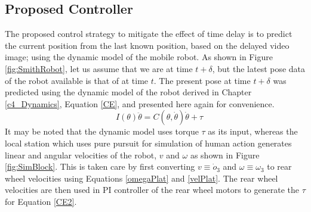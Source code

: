 \subsection{Proposed Controller}
The proposed control strategy to mitigate the effect of time delay is to predict the current position from the last known position, based on the delayed video image; using  the dynamic model of the mobile robot.  As shown in Figure \ref{fig:SmithRobot}, let us assume that we are at time $t+\delta$, but the latest pose  data of the robot available is that of at time $t$. The present pose at time $t+\delta$ was predicted  using  the dynamic model  of the robot derived in Chapter \ref{c4_Dynamics}, Equation \ref{CE}, and presented here again for convenience. 
\begin{equation}
\label{CE2}
\quad I(\theta)\ddot{\theta}=C(\theta,\dot{\theta})\dot{\theta}+\tau
\end{equation}
It may be noted that the dynamic model uses torque $\tau$ as its input, whereas the local station which uses pure pursuit for simulation of  human action   generates linear and angular velocities of the robot,  $v$ and $\omega$ as shown in Figure \ref{fig:SimBlock}. This is taken care by first converting $v \equiv\dot o_3$ and $\omega\equiv\omega_3$ to rear wheel velocities using Equations \ref{omegaPlat} and \ref{velPlat}. The rear wheel velocities  are then used in PI controller of the rear wheel motors to generate the $\tau$ for Equation \ref{CE2}.

